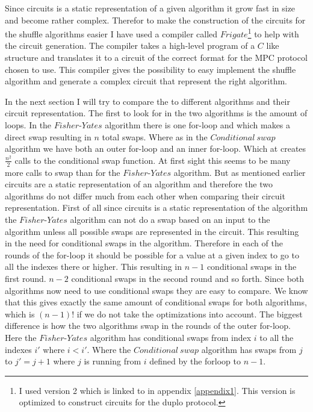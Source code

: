 

Since circuits is a static representation of a given algorithm it grow fast in size and become rather complex. Therefor to make the construction of the circuits for the shuffle algorithms easier I have used a compiler called $Frigate$\footnote{I used version 2 which is linked to in appendix \ref{appendix1}. This version is optimized to construct circuits for the duplo protocol.} to help with the circuit generation. The compiler takes a high-level program of a $C$ like structure and translates it to a circuit of the correct format for the MPC protocol chosen to use. This compiler gives the possibility to easy implement the shuffle algorithm and generate a complex circuit that represent the right algorithm.

\bigskip
In the next section I will try to compare the to different algorithms and their circuit representation. The first to look for in the two algorithms is the amount of loops. In the $Fisher\text{-}Yates$ algorithm there is one for-loop and which makes a direct swap resulting in $n$ total swaps. Where as in the $Conditional~swap$ algorithm we have both an outer for-loop and an inner for-loop. Which at creates $\frac{n^2}{2}$ calls to the conditional swap function. At first sight this seems to be many more calls to swap than for the $Fisher\text{-}Yates$ algorithm. But as mentioned earlier circuits are a static representation of an algorithm and therefore the two algorithms do not differ much from each other when comparing their circuit representation. First of all since circuits is a static representation of the algorithm the $Fisher\text{-}Yates$ algorithm can not do a swap based on an input to the algorithm unless all possible swaps are represented in the circuit. This resulting in the need for conditional swaps in the algorithm. Therefore in each of the rounds of the for-loop it should be possible for a value at a given index to go to all the indexes there or higher. This resulting in $n-1$ conditional swaps in the first round. $n-2$ conditional swaps in the second round and so forth. Since both algorithms now need to use conditional swaps they are easy to compare. We know that this gives exactly the same amount of conditional swaps for both algorithms, which is $(n-1)!$ if we do not take the optimizations into account. The biggest difference is how the two algorithms swap in the rounds of the outer for-loop. Here the $Fisher\text{-}Yates$ algorithm has conditional swaps from index $i$ to all the indexes $i'$ where $i<i'$. Where the $Conditional~swap$ algorithm has swaps from $j$ to $j'= j+1$ where $j$ is running from $i$ defined by the forloop to $n-1$.

